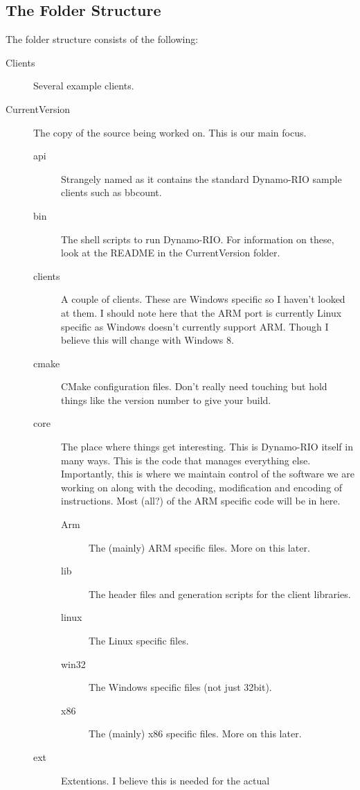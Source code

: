 \documentclass[a4paper]{article}
\begin{document}
\subsection{The Folder Structure}
The folder structure consists of the following:
\begin{description}
\item[Clients] Several example clients.
\item[CurrentVersion] The copy of the source being worked on. This is 
our main
focus.
        \begin{description}
        \item[api] Strangely named as it contains the standard 
Dynamo-RIO sample clients
        such as bbcount.
        \item[bin] The shell scripts to run Dynamo-RIO. For information 
on these, look
        at the README in the CurrentVersion folder.
        \item[clients] A couple of clients. These are Windows specific 
so I haven't
        looked at them. I should note here that the ARM port is 
currently Linux specific
        as Windows doesn't currently support ARM. Though I believe this 
will change with
        Windows 8.
        \item[cmake] CMake configuration files. Don't really need 
touching but hold
        things like the version number to give your build.
        \item[core] The place where things get interesting. This is 
Dynamo-RIO itself in
        many ways. This is the code that manages everything else. 
Importantly, this is
        where we maintain control of the software we are working on 
along with the
        decoding, modification and encoding of instructions. Most (all?) 
of the ARM
        specific code will be in here.
        \begin{description}
                \item[Arm] The (mainly) ARM specific files. More on this 
later.
                \item[lib] The header files and generation scripts for 
the client libraries.
                \item[linux] The Linux specific files.
                \item[win32] The Windows specific files (not just 
32bit).
                \item[x86] The (mainly) x86 specific files. More on this 
later.
        \end{description}
        \item[ext] Extentions. I believe this is needed for the actual 

\end{description}
\end{description}
\end{document}
